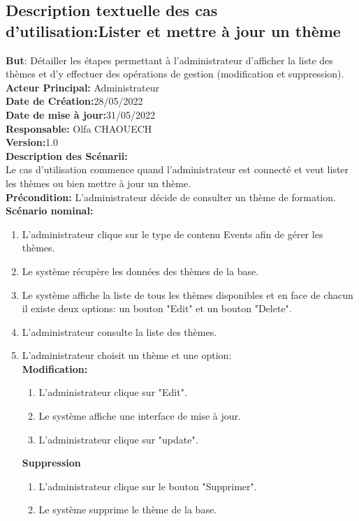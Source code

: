 \subsection{Description textuelle des cas d’utilisation:Lister et mettre à jour un thème}
\textbf{But}: Détailler les étapes permettant à l'administrateur d'afficher la liste des thèmes et d'y effectuer des opérations de gestion (modification et suppression).\\
\textbf{Acteur Principal:} Administrateur \\
\textbf{Date de Création:}28/05/2022\\
\textbf{Date de mise à jour:}31/05/2022\\
\textbf{Responsable:} Olfa CHAOUECH\\
\textbf{Version:}1.0\\
\textbf{Description des Scénarii:}\\
Le cas d'utilisation commence quand l'administrateur est connecté et veut lister les thèmes ou bien mettre à jour un thème.\\
\textbf{Précondition:} L'administrateur décide de consulter un thème de formation.\\
\textbf{Scénario nominal:}
\begin{enumerate}
	\item L'administrateur clique sur le type de contenu Events afin de gérer les thèmes.
	\item Le système récupère les données des thèmes de la base.
	\item Le système affiche la liste de tous les thèmes disponibles et en face de chacun il existe deux options: un bouton "Edit" et un bouton "Delete".
	\item L'administrateur consulte la liste des thèmes.
	\item L'administrateur choisit un thème et une option:\\
	\textbf{Modification:}
	\begin{enumerate}
		\item L'administrateur clique sur "Edit".
		\item Le système affiche une interface de mise à jour.
		\item L'administrateur clique sur "update".
	\end{enumerate}
	\textbf{Suppression}
	\begin{enumerate}
		\item L'administrateur clique sur le bouton "Supprimer".
		\item Le système supprime le thème de la base.
	\end{enumerate}
	
\end{enumerate}
